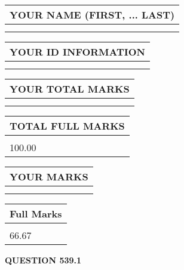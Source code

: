 \documentclass{ctexart}
\begin{document}
   
   
   
\newpage 
\setcounter{page}{ 
   539001 } 
   
   
   
   
\noindent\begin{tabular}{|l|}
\hline
YOUR NAME (FIRST, ... LAST)  \\
\hline
 \\ 
 \\ 
\hline
\end{tabular}
\hspace{0.05in} \begin{tabular}{|l|}
\hline
 YOUR   ID   INFORMATION  \\
\hline
 \\ 
 \\ 
\hline
\end{tabular}
   
   
\vspace{0.2in}\noindent\begin{tabular}{|l|}
\hline
YOUR TOTAL MARKS  \\
\hline
 \\ 
 \\ 
\hline
\end{tabular}
\hspace{0.05in} \begin{tabular}{|l|}
\hline
TOTAL FULL MARKS  \\
\hline
 \\ 
100.00 \\
\hline
\end{tabular}
   
   
 \vspace{0.2in}
 
 
 
 
   
   
  
\vspace{0.2in}
  
\noindent\begin{tabular}{|l|}
\hline
 YOUR MARKS  \\
\hline
 \\ 
 \\ 
\hline
\end{tabular}
\hspace{0.05in} \begin{tabular}{|l|}
\hline
 Full Marks  \\
\hline
 \\ 
66.67 \\
\hline
\end{tabular}
{\textbf{\Large{QUESTION
539.1 
}}}
  
\end{document}
